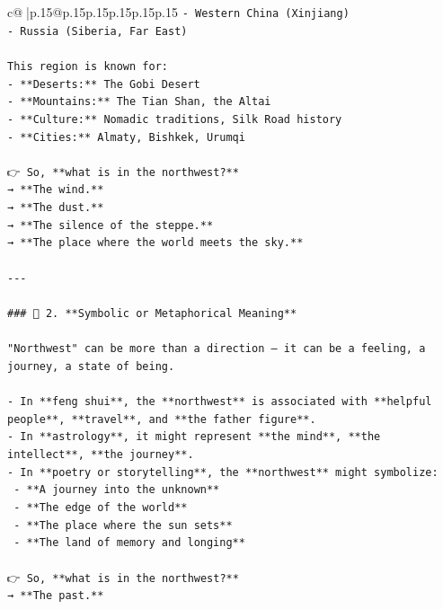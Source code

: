 \documentclass{article}
\begin{document}
{\begin{supertabular}{c@{$\;$}|p{.15\linewidth}@{}p{.15\linewidth}p{.15\linewidth}p{.15\linewidth}p{.15\linewidth}p{.15\linewidth}}
{{{\texttt{{-} Western China (Xinjiang)} \\
\texttt{{-} Russia (Siberia, Far East)} \\
\\ 
\texttt{This region is known for:} \\
\texttt{{-} **Deserts:** The Gobi Desert} \\
\texttt{{-} **Mountains:** The Tian Shan, the Altai} \\
\texttt{{-} **Culture:** Nomadic traditions, Silk Road history} \\
\texttt{{-} **Cities:** Almaty, Bishkek, Urumqi} \\
\\ 
\texttt{👉 So, **what is in the northwest?**  } \\
\texttt{→ **The wind.**  } \\
\texttt{→ **The dust.**  } \\
\texttt{→ **The silence of the steppe.**  } \\
\texttt{→ **The place where the world meets the sky.**} \\
\\ 
\texttt{{-}{-}{-}} \\
\\ 
\texttt{\#\#\# 🔹 2. **Symbolic or Metaphorical Meaning**} \\
\\ 
\texttt{"Northwest" can be more than a direction — it can be a feeling, a journey, a state of being.} \\
\\ 
\texttt{{-} In **feng shui**, the **northwest** is associated with **helpful people**, **travel**, and **the father figure**.} \\
\texttt{{-} In **astrology**, it might represent **the mind**, **the intellect**, **the journey**.} \\
\texttt{{-} In **poetry or storytelling**, the **northwest** might symbolize:} \\
\texttt{  {-} **A journey into the unknown**} \\
\texttt{  {-} **The edge of the world**} \\
\texttt{  {-} **The place where the sun sets**} \\
\texttt{  {-} **The land of memory and longing**} \\
\\ 
\texttt{👉 So, **what is in the northwest?**  } \\
\texttt{→ **The past.**  } \\
}}}
\end{supertabular}}
\end{document}
